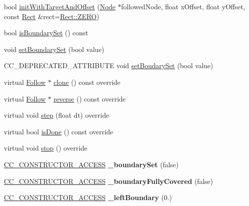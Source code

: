 \begin{DoxyCompactItemize}
\item 
bool \hyperlink{classFollow_ad9a776217489f9a9d545df6f7cf6e7bb}{init\+With\+Target\+And\+Offset} (\hyperlink{classNode}{Node} $\ast$followed\+Node, float x\+Offset, float y\+Offset, const \hyperlink{classRect}{Rect} \&rect=\hyperlink{classRect_a590be46e60027b2ca0f62a457f91a83e}{Rect\+::\+Z\+E\+RO})
\item 
bool \hyperlink{classFollow_a3f4d2d2ab13c544d7c40aa2a96fb2719}{is\+Boundary\+Set} () const
\item 
void \hyperlink{classFollow_ad01fd1c960695a80e893300d3996bb13}{set\+Boundary\+Set} (bool value)
\item 
C\+C\+\_\+\+D\+E\+P\+R\+E\+C\+A\+T\+E\+D\+\_\+\+A\+T\+T\+R\+I\+B\+U\+TE void \hyperlink{classFollow_a509872f55b024bef0b5e4b8f4ca54692}{set\+Boudary\+Set} (bool value)
\item 
virtual \hyperlink{classFollow}{Follow} $\ast$ \hyperlink{classFollow_a53e431827bb6b8735aacdf3abcceecc4}{clone} () const override
\item 
virtual \hyperlink{classFollow}{Follow} $\ast$ \hyperlink{classFollow_ab9c5121dfd9909fd284c5886cd545aed}{reverse} () const override
\item 
virtual void \hyperlink{classFollow_a808fb0fab228b588de9642dc40bf9a14}{step} (float dt) override
\item 
virtual bool \hyperlink{classFollow_a643d457b3bd235733eb9ae63ef5ebc1f}{is\+Done} () const override
\item 
virtual void \hyperlink{classFollow_af3b58aa360668e6e1203a48f23276b74}{stop} () override
\item 
\mbox{\label{classFollow_abcee9c5efe03ea988363556dbb33c352}} 
\hyperlink{_2cocos2d_2cocos_2base_2ccConfig_8h_a25ef1314f97c35a2ed3d029b0ead6da0}{C\+C\+\_\+\+C\+O\+N\+S\+T\+R\+U\+C\+T\+O\+R\+\_\+\+A\+C\+C\+E\+SS} {\bfseries \+\_\+boundary\+Set} (false)
\item 
\mbox{\label{classFollow_a6a3e68a5a061663b0b15bfb675a35881}} 
\hyperlink{_2cocos2d_2cocos_2base_2ccConfig_8h_a25ef1314f97c35a2ed3d029b0ead6da0}{C\+C\+\_\+\+C\+O\+N\+S\+T\+R\+U\+C\+T\+O\+R\+\_\+\+A\+C\+C\+E\+SS} {\bfseries \+\_\+boundary\+Fully\+Covered} (false)
\item 
\mbox{\label{classFollow_adcdd03b4a8669a1f3c087665aa61251d}} 
\hyperlink{_2cocos2d_2cocos_2base_2ccConfig_8h_a25ef1314f97c35a2ed3d029b0ead6da0}{C\+C\+\_\+\+C\+O\+N\+S\+T\+R\+U\+C\+T\+O\+R\+\_\+\+A\+C\+C\+E\+SS} {\bfseries \+\_\+left\+Boundary} (0.)

\end{DoxyCompactItemize}
